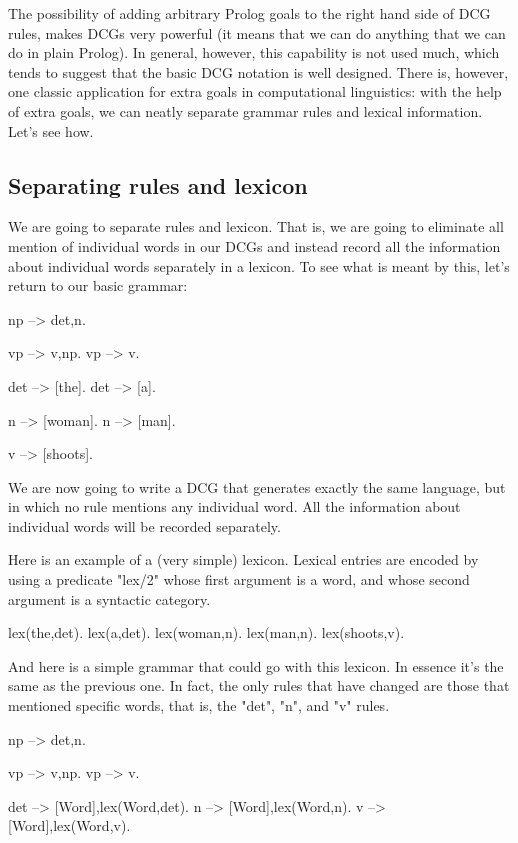 The possibility of adding arbitrary Prolog goals to the right hand
side of DCG rules, makes DCGs very powerful (it means that we can do
anything that we can do in plain Prolog). In general, however, this
capability is not used much, which tends to suggest that the basic DCG
notation is well designed.  There is, however, one classic application
for extra goals in computational linguistics: with the help of extra
goals, we can neatly separate grammar rules and lexical
information. Let's see how.

\subsection*{Separating rules and lexicon}\label{SUBSEC.L8.SEP.RULE.LEX}


We are going to separate rules and lexicon. That is, we are going to
eliminate all mention of individual words in our DCGs and instead
record all the information about individual words separately in a
lexicon.  To see what is meant by this, let's return to our basic
grammar:
\begin{LPNcodedisplay}
np --> det,n.

vp --> v,np.
vp --> v.

det --> [the].
det --> [a].

n --> [woman].
n --> [man].

v --> [shoots].
\end{LPNcodedisplay}
We are now going to write a DCG that generates exactly
the same language, but in which no rule mentions any individual
word. All the information about individual words will be recorded
separately.


Here is an example of a (very simple) lexicon. Lexical entries are
encoded by using a predicate "lex/2" whose first argument is a
word, and whose second argument is a syntactic category.
\begin{LPNcodedisplay}
lex(the,det).
lex(a,det).
lex(woman,n).
lex(man,n).
lex(shoots,v).
\end{LPNcodedisplay}

And here is a simple grammar that could go with this lexicon.  In
essence it's the same as the previous one.  In fact, the only rules
that have changed are those that mentioned specific words, that is,
the "det", "n", and "v" rules.
\begin{LPNcodedisplay}
np --> det,n.

vp --> v,np.
vp --> v.

det --> [Word],{lex(Word,det)}.
n --> [Word],{lex(Word,n)}.
v --> [Word],{lex(Word,v)}.
\end{LPNcodedisplay}

